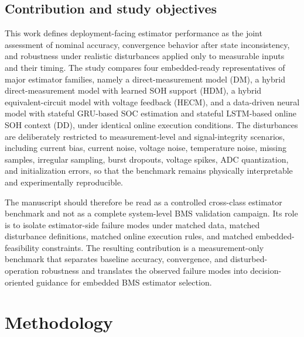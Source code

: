 \documentclass[review]{elsarticle}
\begin{document}
\subsection{Contribution and study objectives}
This work defines deployment-facing estimator performance as the joint assessment of nominal accuracy, convergence behavior after state inconsistency, and robustness under realistic disturbances applied only to measurable inputs and their timing. The study compares four embedded-ready representatives of major estimator families, namely a direct-measurement model (DM), a hybrid direct-measurement model with learned SOH support (HDM), a hybrid equivalent-circuit model with voltage feedback (HECM), and a data-driven neural model with stateful GRU-based SOC estimation and stateful LSTM-based online SOH context (DD), under identical online execution conditions. The disturbances are deliberately restricted to measurement-level and signal-integrity scenarios, including current bias, current noise, voltage noise, temperature noise, missing samples, irregular sampling, burst dropouts, voltage spikes, ADC quantization, and initialization errors, so that the benchmark remains physically interpretable and experimentally reproducible.

The manuscript should therefore be read as a controlled cross-class estimator benchmark and not as a complete system-level BMS validation campaign. Its role is to isolate estimator-side failure modes under matched data, matched disturbance definitions, matched online execution rules, and matched embedded-feasibility constraints. The resulting contribution is a measurement-only benchmark that separates baseline accuracy, convergence, and disturbed-operation robustness and translates the observed failure modes into decision-oriented guidance for embedded BMS estimator selection.

\section{Methodology}
\end{document}
